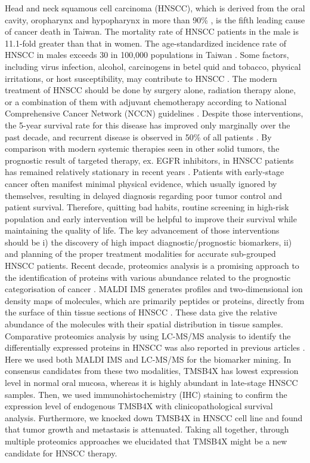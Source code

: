 \documentclass[12pt, a4paper]{article}
\begin{document}
Head and neck squamous cell carcinoma (HNSCC), which is derived from the oral cavity, oropharynx and hypopharynx in more than 90\% \citep{Warnakulasuriya2009}, is the fifth leading cause of cancer death in Taiwan. The mortality rate of HNSCC patients in the male is 11.1-fold greater than that in women. The age-standardized incidence rate of HNSCC in males exceeds 30 in 100,000 populations in Taiwan \citep{MOHW2016, MOHW_incidence2018}.
Some factors, including virus infection, alcohol, carcinogens in betel quid and tobacco, physical irritations, or host susceptibility, may contribute to HNSCC \citep{Ko1995} \citep{Znaori2003}. The modern treatment of HNSCC should be done by surgery alone, radiation therapy alone, or a combination of them with adjuvant chemotherapy according to National Comprehensive Cancer Network (NCCN) guidelines \citep{Pfister2020a}. Despite those interventions, the 5-year survival rate for this disease has improved only marginally over the past decade, and recurrent disease is observed in 50\% of all patients \citep{Warnakulasuriya2009} \citep{Forastiere2001}. By comparison with modern systemic therapies seen in other solid tumors, the prognostic result of targeted therapy, ex. EGFR inhibitors, in HNSCC patients has remained relatively stationary in recent years \citep{Argiris2015a}. Patients with early-stage cancer often manifest minimal physical evidence, which usually ignored by themselves, resulting in delayed diagnosis regarding poor tumor control and patient survival. Therefore, quitting bad habits, routine screening in high-risk population and early intervention will be helpful to improve their survival while maintaining the quality of life. The key advancement of those interventions should be i) the discovery of high impact diagnostic/prognostic biomarkers, ii) and planning of the proper treatment modalities for accurate sub-grouped HNSCC patients.
Recent decade, proteomics analysis is a promising approach to the identification of proteins with various abundance related to the prognostic categorisation of cancer \citep{Sallam2015}. MALDI IMS generates profiles and two-dimensional ion density maps of molecules, which are primarily peptides or proteins, directly from the surface of thin tissue sections of HNSCC \citep{Xie2016}. These data give the relative abundance of the molecules with their spatial distribution in tissue samples. Comparative proteomics analysis by using LC-MS/MS analysis to identify the differentially expressed proteins in HNSCC was also reported in previous articles \citep{Wei2009} \citep{Chanthammachat2013}. 
Here we used both MALDI IMS and LC-MS/MS for the biomarker mining. In consensus candidates from these two modalities, TMSB4X has lowest expression level in normal oral mucosa, whereas it is highly abundant in late-stage HNSCC samples. Then, we used immunohistochemistry (IHC) staining to confirm the expression level of endogenous TMSB4X with clinicopathological survival analysis. Furthermore, we knocked down TMSB4X in HNSCC cell line and found that tumor growth and metastasis is attenuated. Taking all together, through multiple proteomics approaches we elucidated that TMSB4X might be a new candidate for HNSCC therapy.
\end{document}
